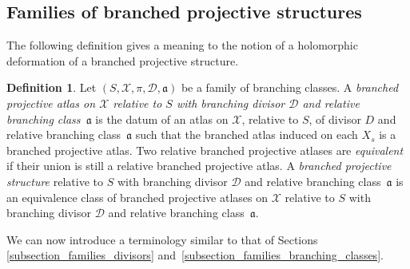 \documentclass[10pt]{amsart}
\theoremstyle{definition}
\newtheorem{definition}{Definition}[subsection]
\theoremstyle{plain}
\begin{document}
\subsection{Families of branched projective structures}\label{subsection_families_bps}

The following definition gives a meaning to the notion of a holomorphic deformation of a branched projective structure.

\begin{definition}\label{definition_relative_bps}
Let $(S, \mathcal X, \pi, \mathcal D, \mathfrak a)$ be a family of branching classes.
A \emph{branched projective atlas on $\mathcal X$ relative to $S$ with branching divisor $\mathcal D$ and relative branching class~$\mathfrak a$} is the datum of an atlas on $\mathcal X$, relative to $S$, of divisor $D$ and relative branching class~$\mathfrak a$ such that the branched atlas induced on each $X_s$ is a branched projective atlas.
Two relative branched projective atlases are \emph{equivalent} if their union is still a relative branched projective atlas.
A \emph{branched projective structure} relative to $S$ with branching divisor $\mathcal D$ and relative branching class~$\mathfrak a$ is an equivalence class of branched projective atlases on $\mathcal X$ relative to $S$ with branching divisor $\mathcal D$ and relative branching class~$\mathfrak a$.
\end{definition}

We can now introduce a terminology similar to that of Sections \ref{subsection_families_divisors} and~\ref{subsection_families_branching_classes}.
\end{document}
